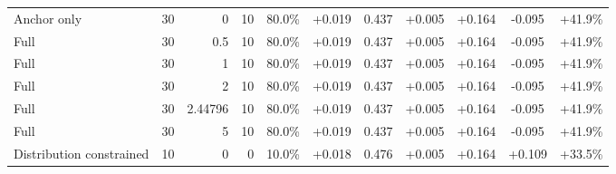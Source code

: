 \begin{table}[htbp]
\begin{tabular}{lrrrccccccc}
Anchor only & 30 & 0 & 10 & 80.0\% & +0.019 & 0.437 & +0.005 & +0.164 & -0.095 & +41.9\% \\
Full & 30 & 0.5 & 10 & 80.0\% & +0.019 & 0.437 & +0.005 & +0.164 & -0.095 & +41.9\% \\
Full & 30 & 1 & 10 & 80.0\% & +0.019 & 0.437 & +0.005 & +0.164 & -0.095 & +41.9\% \\
Full & 30 & 2 & 10 & 80.0\% & +0.019 & 0.437 & +0.005 & +0.164 & -0.095 & +41.9\% \\
Full & 30 & 2.44796 & 10 & 80.0\% & +0.019 & 0.437 & +0.005 & +0.164 & -0.095 & +41.9\% \\
Full & 30 & 5 & 10 & 80.0\% & +0.019 & 0.437 & +0.005 & +0.164 & -0.095 & +41.9\% \\
Distribution constrained & 10 & 0 & 0 & 10.0\% & +0.018 & 0.476 & +0.005 & +0.164 & +0.109 & +33.5\% \\
\bottomrule
\end{tabular}
\end{table}
